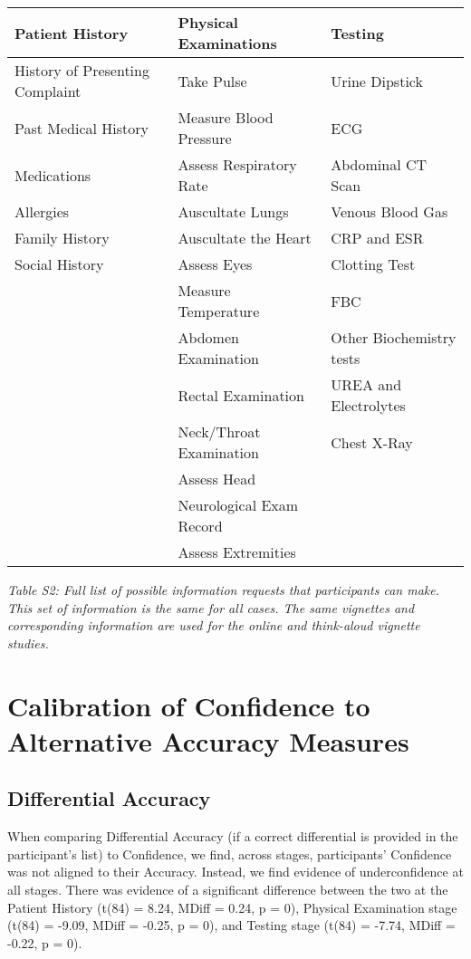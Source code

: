 \documentclass[
]{article}
\begin{document}
\begin{longtable}[t]{lll}
\toprule
Patient History & Physical Examinations & Testing\\
\midrule
History of Presenting Complaint & Take Pulse & Urine Dipstick\\
Past Medical History & Measure Blood Pressure & ECG\\
Medications & Assess Respiratory Rate & Abdominal CT Scan\\
Allergies & Auscultate Lungs & Venous Blood Gas\\
Family History & Auscultate the Heart & CRP and ESR\\
\addlinespace
Social History & Assess Eyes & Clotting Test\\
 & Measure Temperature & FBC\\
 & Abdomen Examination & Other Biochemistry tests\\
 & Rectal Examination & UREA and Electrolytes\\
 & Neck/Throat Examination & Chest X-Ray\\
\addlinespace
 & Assess Head & \\
 & Neurological Exam Record & \\
 & Assess Extremities & \\
\bottomrule
\end{longtable}

\emph{Table S2: Full list of possible information requests that
participants can make. This set of information is the same for all
cases. The same vignettes and corresponding information are used for the
online and think-aloud vignette studies.}

\section{Calibration of Confidence to Alternative Accuracy
Measures}\label{calibration-of-confidence-to-alternative-accuracy-measures}

\subsection{Differential Accuracy}\label{differential-accuracy}

When comparing Differential Accuracy (if a correct differential is
provided in the participant's list) to Confidence, we find, across
stages, participants' Confidence was not aligned to their Accuracy.
Instead, we find evidence of underconfidence at all stages. There was
evidence of a significant difference between the two at the Patient
History (t(84) = 8.24, MDiff = 0.24, p = 0), Physical Examination stage
(t(84) = -9.09, MDiff = -0.25, p = 0), and Testing stage (t(84) = -7.74,
MDiff = -0.22, p = 0).
\end{document}
